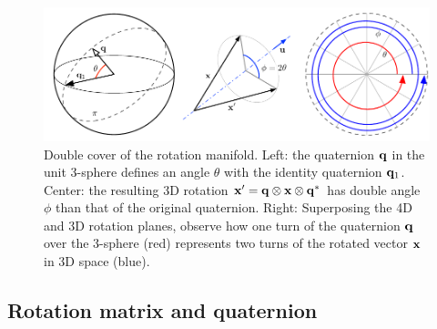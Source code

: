 \begin{figure}[htbp]
\begin{center}
\includegraphics{figures/double_cover}
\caption{Double cover of the rotation manifold. Left: the quaternion ${\bf q}$ in the unit 3-sphere defines an angle $\theta$ with the identity quaternion ${\bf q}_1$. Center: the resulting 3D rotation ${\bf x}'={\bf q}\otimes{\bf x}\otimes{\bf q}^*$ has double angle $\phi$ than that of the original quaternion. Right: Superposing the 4D and 3D rotation planes, observe how one turn of the quaternion ${\bf q}$ over the 3-sphere (red) represents two turns of the rotated vector ${\bf x}$ in 3D space (blue).}
\label{fig:double_cover}
\end{center}
\end{figure}






\subsection{Rotation matrix and quaternion}

